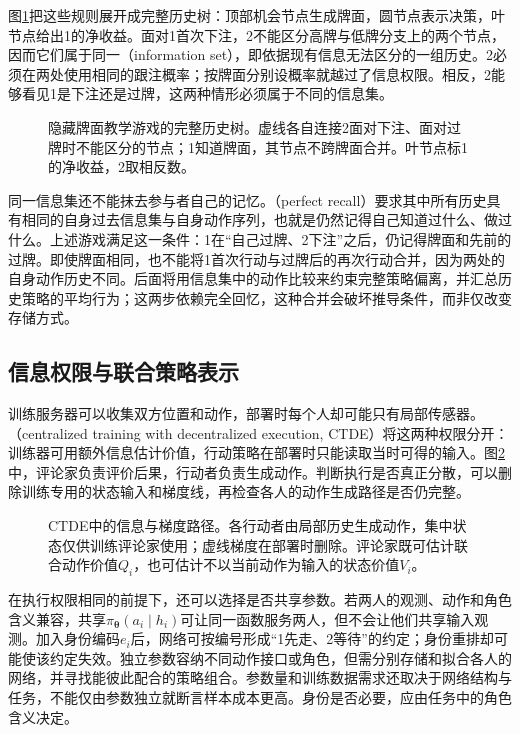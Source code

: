 图\ref{fig:rl-multi-agent-card-tree}把这些规则展开成完整历史树：顶部机会节点生成牌面，圆节点表示决策，叶节点给出1的净收益。面对1首次下注，2不能区分高牌与低牌分支上的两个节点，因而它们属于同一（information set），即依据现有信息无法区分的一组历史。2必须在两处使用相同的跟注概率；按牌面分别设概率就越过了信息权限。相反，2能够看见1是下注还是过牌，这两种情形必须属于不同的信息集。

\begin{figure}[htbp]
 \centering
 
 \caption{隐藏牌面教学游戏的完整历史树。虚线各自连接2面对下注、面对过牌时不能区分的节点；1知道牌面，其节点不跨牌面合并。叶节点标1的净收益，2取相反数。}
 \label{fig:rl-multi-agent-card-tree}
\end{figure}

同一信息集还不能抹去参与者自己的记忆。（perfect recall）要求其中所有历史具有相同的自身过去信息集与自身动作序列，也就是仍然记得自己知道过什么、做过什么。上述游戏满足这一条件：1在“自己过牌、2下注”之后，仍记得牌面和先前的过牌。即使牌面相同，也不能将1首次行动与过牌后的再次行动合并，因为两处的自身动作历史不同。后面将用信息集中的动作比较来约束完整策略偏离，并汇总历史策略的平均行为；这两步依赖完全回忆，这种合并会破坏推导条件，而非仅改变存储方式。

\subsection{信息权限与联合策略表示}
\label{sec:rl-multi-agent-permissions}

训练服务器可以收集双方位置和动作，部署时每个人却可能只有局部传感器。（centralized training with decentralized execution, CTDE）将这两种权限分开：训练器可用额外信息估计价值，行动策略在部署时只能读取当时可得的输入。图\ref{fig:rl-multi-agent-ctde}中，评论家负责评价后果，行动者负责生成动作。判断执行是否真正分散，可以删除训练专用的状态输入和梯度线，再检查各人的动作生成路径是否仍完整。

\begin{figure}[htbp]
 \centering
 
 \caption{CTDE中的信息与梯度路径。各行动者由局部历史生成动作，集中状态仅供训练评论家使用；虚线梯度在部署时删除。评论家既可估计联合动作价值$Q_i$，也可估计不以当前动作为输入的状态价值$V_i$。}
 \label{fig:rl-multi-agent-ctde}
\end{figure}

在执行权限相同的前提下，还可以选择是否共享参数。若两人的观测、动作和角色含义兼容，共享$\pi_{\bm\theta}(a_i\mid h_i)$可让同一函数服务两人，但不会让他们共享输入观测。加入身份编码$e_i$后，网络可按编号形成“1先走、2等待”的约定；身份重排却可能使该约定失效。独立参数容纳不同动作接口或角色，但需分别存储和拟合各人的网络，并寻找能彼此配合的策略组合。参数量和训练数据需求还取决于网络结构与任务，不能仅由参数独立就断言样本成本更高。身份是否必要，应由任务中的角色含义决定。

